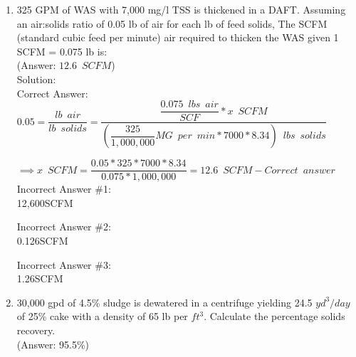 \begin{enumerate}
\item 325 GPM of WAS with 7,000 mg/l TSS is thickened in a DAFT.  Assuming an air:solids ratio of 0.05 lb of air for each lb of feed solids, The SCFM (standard cubic feed per minute) air required to thicken the WAS given 1 SCFM = 0.075 lb is:\\
(Answer:  $12.6 \enspace SCFM$)\\
Solution:\\

Correct Answer:\\
$0.05=\dfrac{lb \enspace air}{lb \enspace solids}=\dfrac{\dfrac{0.075 \enspace lbs  \enspace air}{SCF}*x \enspace SCFM}{(\dfrac{325}{1,000,000}MG \enspace per \enspace min*7000*8.34) \enspace lbs  \enspace solids}$\\
\vspace{0.25cm}

$\implies x \enspace SCFM=\dfrac{0.05*325*7000*8.34}{0.075*1,000,000}=\boxed{12.6 \enspace SCFM} - Correct \enspace answer$\\
\vspace{0.25cm}
Incorrect Answer \#1:\\
12,600SCFM

\vspace{0.25cm}
Incorrect Answer \#2:\\
0.126SCFM


\vspace{0.25cm}
Incorrect Answer \#3:\\
1.26SCFM

\vspace{1cm}



\item 30,000 gpd of 4.5\% sludge is dewatered in a centrifuge yielding 24.5 $yd^3/day$ of 25\% cake with a density of 65 lb per $ft^3$.  Calculate the percentage solids recovery.\\
(Answer: 95.5\%)\\
\vspace{1cm}


\end{enumerate}
